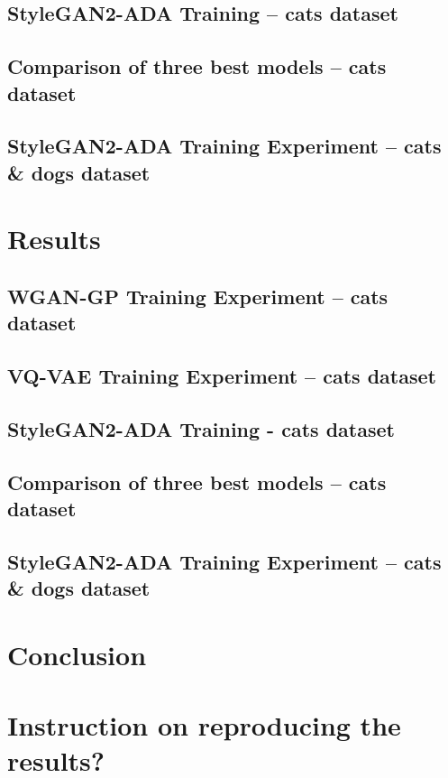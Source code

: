 \documentclass{article}
\begin{document}


\subsection{StyleGAN2-ADA Training -- cats dataset}

\subsection{Comparison of three best models -- cats dataset}

\subsection{StyleGAN2-ADA Training Experiment -- cats \& dogs dataset}

\section{Results}

\subsection{WGAN-GP Training Experiment -- cats dataset}

\subsection{VQ-VAE Training Experiment -- cats dataset}

\subsection{StyleGAN2-ADA Training - cats dataset}

\subsection{Comparison of three best models -- cats dataset}

\subsection{StyleGAN2-ADA Training Experiment --  cats \& dogs dataset}

\section{Conclusion}

\section{Instruction on reproducing the results?}  



\end{document}
